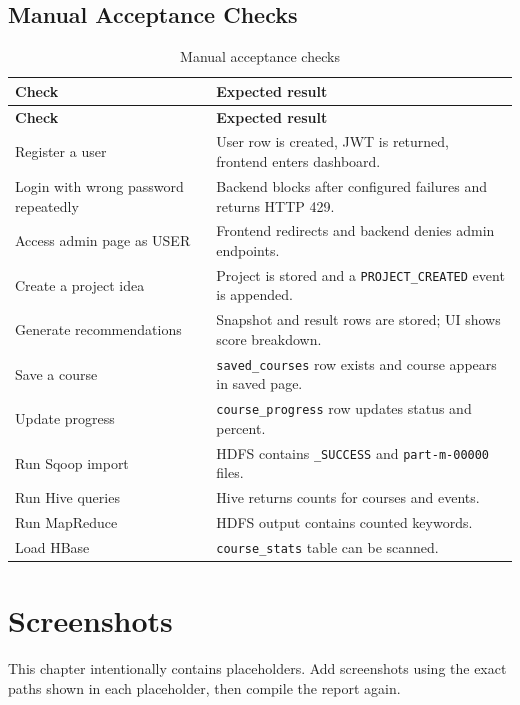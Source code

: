 \documentclass[12pt,a4paper]{report}
\begin{document}
\section{Manual Acceptance Checks}
\begin{longtable}{p{}p{}}
\caption{Manual acceptance checks}\\
\toprule
\textbf{Check} & \textbf{Expected result}\\
\midrule
\endfirsthead
\toprule
\textbf{Check} & \textbf{Expected result}\\
\midrule
\endhead
Register a user & User row is created, JWT is returned, frontend enters dashboard.\\
Login with wrong password repeatedly & Backend blocks after configured failures and returns HTTP 429.\\
Access admin page as USER & Frontend redirects and backend denies admin endpoints.\\
Create a project idea & Project is stored and a \texttt{PROJECT\_CREATED} event is appended.\\
Generate recommendations & Snapshot and result rows are stored; UI shows score breakdown.\\
Save a course & \texttt{saved\_courses} row exists and course appears in saved page.\\
Update progress & \texttt{course\_progress} row updates status and percent.\\
Run Sqoop import & HDFS contains \texttt{\_SUCCESS} and \texttt{part-m-00000} files.\\
Run Hive queries & Hive returns counts for courses and events.\\
Run MapReduce & HDFS output contains counted keywords.\\
Load HBase & \texttt{course\_stats} table can be scanned.\\
\bottomrule
\end{longtable}

\chapter{Screenshots}

This chapter intentionally contains placeholders. Add screenshots using the exact paths shown in each placeholder, then compile the report again.
\end{document}
